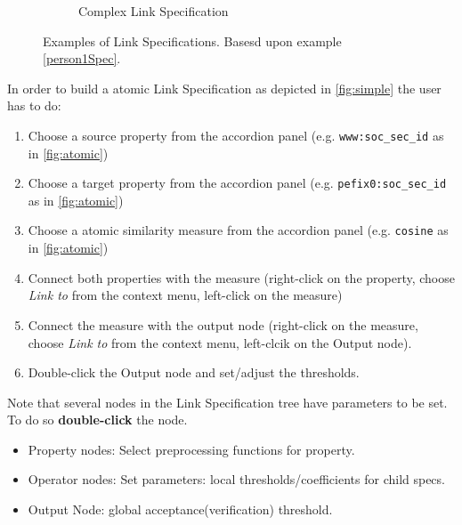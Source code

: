 \documentclass[oneside,a4paper,12pt]{memoir}
\begin{document}
\begin{figure}
\begin{subfigure}[b]{0.6\textwidth}
                \caption{Complex Link Specification}
                \label{fig:complex}
        \end{subfigure}
        \caption{Examples of Link Specifications. Basesd upon example \ref{person1Spec}.}
\label{fig:metrics}
\end{figure}

In order to build a atomic Link Specification as depicted in \ref{fig:simple} the user has to do:

\begin{enumerate}
	\item Choose a source property from the accordion panel (e.g. \texttt{www:soc\_sec\_id} as in \ref{fig:atomic})
	\item Choose a target property from the accordion panel (e.g. \texttt{pefix0:soc\_sec\_id} as in \ref{fig:atomic})
	\item Choose a atomic similarity measure from the accordion panel (e.g. \texttt{cosine} as in \ref{fig:atomic})
	\item Connect both properties with the measure (right-click on the property, choose \textit{Link to} from the context menu, left-click on the measure)
	\item Connect the measure with the output node (right-click on the measure, choose \textit{Link to} from the context menu, left-clcik on the Output node).
	\item Double-click the Output node and set/adjust the thresholds.
\end{enumerate}

Note that several nodes in the Link Specification tree have parameters to be set. To do so \textbf{double-click} the node.
\begin{itemize}
	\item Property nodes: Select preprocessing functions for property.
	\item Operator nodes: Set parameters: local thresholds/coefficients for child specs.
	\item Output Node: global acceptance(verification) threshold.
\end{itemize}
\end{document}
